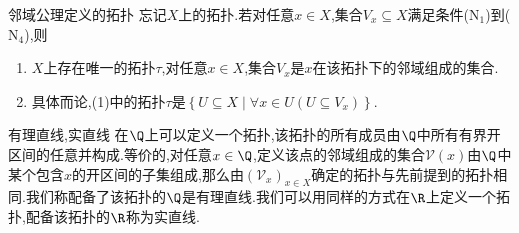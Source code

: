 \begin{proposition}{邻域公理定义的拓扑}{}
	忘记$X$上的拓扑.若对任意$x\in X$,集合$V_{x}\subseteq X$满足条件($\mathrm{N}_{1}$)到($\mathrm{N}_{4}$),则
	\begin{enumerate}
		\item $X$上存在唯一的拓扑$\tau$,对任意$x\in X$,集合$V_{x}$是$x$在该拓扑下的邻域组成的集合.
		\item 具体而论,(1)中的拓扑$\tau$是$\left\{U\subseteq X\middle|\forall x\in U\left(U\subseteq V_{x}\right)\right\}$.
	\end{enumerate}
\end{proposition}

\begin{example}{有理直线,实直线}{}
	在$\Q$上可以定义一个拓扑,该拓扑的所有成员由$\Q$中所有有界开区间的任意并构成.等价的,对任意$x\in\Q$,定义该点的邻域组成的集合$\mathcal{V}\left(x\right)$由$\Q$中某个包含$x$的开区间的子集组成,那么由$\left(\mathcal{V}_{x}\right)_{x\in X}$确定的拓扑与先前提到的拓扑相同.我们称配备了该拓扑的$\Q$是有理直线.我们可以用同样的方式在$\R$上定义一个拓扑,配备该拓扑的$\R$称为实直线.
\end{example}




